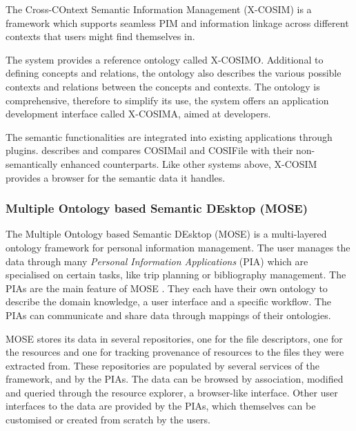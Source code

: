 The Cross-COntext Semantic Information Management (X-COSIM) \cite{Franz2007a} is a framework which supports seamless PIM and information linkage across different contexts that users might find themselves in. 

The system provides a reference ontology called X-COSIMO. Additional to defining concepts and relations, the ontology also describes the various possible contexts and relations between the concepts and contexts. The ontology is comprehensive, therefore to simplify its use, the system offers an application development interface called X-COSIMA, aimed at developers.

The semantic functionalities are integrated into existing applications through plugins. \cite{Franz2007,Franz2009} describes and compares COSIMail and COSIFile with their non-semantically enhanced counterparts. Like other systems above, X-COSIM provides a browser for the semantic data it handles. 

\subsubsection{Multiple Ontology based Semantic DEsktop (MOSE)}

The Multiple Ontology based Semantic DEsktop (MOSE) \cite{Xiao2005} is a multi-layered ontology framework for personal information management. The user manages the data through many \emph{Personal Information Applications} (PIA) which are specialised on certain tasks, like trip planning or bibliography management. The PIAs are the main feature of MOSE \cite{Xiao2006}. They each have their own ontology to describe the domain knowledge, a user interface and a specific workflow. The PIAs can communicate and share data through mappings of their ontologies. 

MOSE stores its data in several repositories, one for the file descriptors, one for the resources and one for tracking provenance of resources to the files they were extracted from. These repositories are populated by several services of the framework, and by the PIAs. The data can be browsed by association, modified and queried through the resource explorer, a browser-like interface. Other user interfaces to the data are provided by the PIAs, which themselves can be customised or created from scratch by the users.







